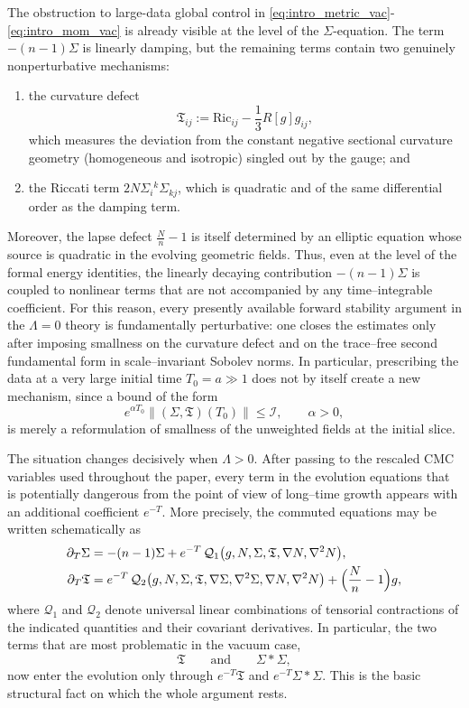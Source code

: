 \documentclass{amsart}
\begin{document}
\noindent The obstruction to large-data global control in \eqref{eq:intro_metric_vac}-\eqref{eq:intro_mom_vac} is already visible at the level of the \(\Sigma\)-equation.  The term \(-(n-1)\Sigma\) is linearly damping, but the remaining terms contain two genuinely nonperturbative mechanisms:
\begin{enumerate}
\item the curvature defect
\[
\mathfrak T_{ij}:=\text{Ric}_{ij}-\frac{1}{3}R[g]g_{ij},
\]
which measures the deviation from the constant negative sectional curvature geometry (homogeneous and isotropic) singled out by the gauge; and
\item the Riccati term \(2N\Sigma_i{}^k\Sigma_{kj}\), which is quadratic and of the same differential order as the damping term.
\end{enumerate}
Moreover, the lapse defect \(\frac{N}{n}-1\) is itself determined by an elliptic equation whose source is quadratic in the evolving geometric fields.  Thus, even at the level of the formal energy identities, the linearly decaying contribution \(-(n-1)\Sigma\) is coupled to nonlinear terms that are not accompanied by any time--integrable coefficient.  For this reason, every presently available forward stability argument in the \(\Lambda=0\) theory is fundamentally perturbative: one closes the estimates only after imposing smallness on the curvature defect and on the trace--free second fundamental form in scale--invariant Sobolev norms.  In particular, prescribing the data at a very large initial time \(T_0=a\gg1\) does not by itself create a new mechanism, since a bound of the form
\[
e^{\alpha T_0}\|(\Sigma,\mathfrak T)(T_0)\|\leq \mathcal I,
\qquad \alpha>0,
\]
is merely a reformulation of smallness of the unweighted fields at the initial slice.

\medskip

\noindent The situation changes decisively when \(\Lambda>0\).  After passing to the rescaled CMC variables used throughout the paper, every term in the evolution equations that is potentially dangerous from the point of view of long--time growth appears with an additional coefficient \(e^{-T}\).  More precisely, the commuted equations may be written schematically as
\begin{align}
\partial_T \Sigma
  &= -(n-1)\Sigma
     + e^{-T}\,\mathcal Q_1\bigl(g,N,\Sigma,\mathfrak T,\nabla N,\nabla^2N\bigr), \label{eq:intro_sigma_lambda_schematic}\\
\partial_T \mathfrak T
  &= e^{-T}\,\mathcal Q_2\bigl(g,N,\Sigma,\mathfrak T,\nabla\Sigma,\nabla^2\Sigma,\nabla N,\nabla^2N\bigr)
     + \Bigl(\frac{N}{n}-1\Bigr)g, \label{eq:intro_T_lambda_schematic}
\end{align}
where \(\mathcal Q_1\) and \(\mathcal Q_2\) denote universal linear combinations of tensorial contractions of the indicated quantities and their covariant derivatives.  In particular, the two terms that are most problematic in the vacuum case,
\[
\mathfrak T
\qquad\text{and}\qquad
\Sigma*\Sigma,
\]
now enter the evolution only through \(e^{-T}\mathfrak T\) and \(e^{-T}\Sigma*\Sigma\).  This is the basic structural fact on which the whole argument rests.
\end{document}
